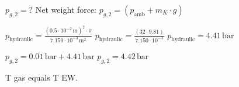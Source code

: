 \( p_{g,2} = ? \)  
Net weight force:  
\( p_{g,2} = (p_{\text{amb}} + m_K \cdot g) \)  

\( p_{\text{hydraulic}} = \frac{(0.5 \cdot 10^{-2} \, \text{m})^2 \cdot \pi}{7.150 \cdot 10^{-3} \, \text{m}^2} \)  
\( p_{\text{hydraulic}} = \frac{(32 \cdot 9.81)}{7.150 \cdot 10^{-3}} \)  
\( p_{\text{hydraulic}} = 4.41 \, \text{bar} \)  

\( p_{g,2} = 0.01 \, \text{bar} + 4.41 \, \text{bar} \)  
\( p_{g,2} = 4.42 \, \text{bar} \)

T gas equals T EW.